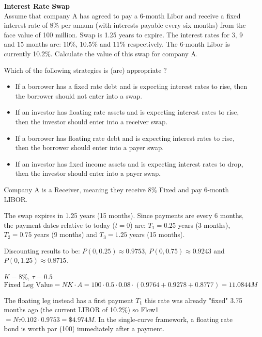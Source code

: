 \documentclass[12pt,a4paper]{exam}
\begin{document}
\begin{questions}
\question \textbf{Interest Rate Swap} \\
Assume that company A has agreed to pay a 6-month Libor and receive a fixed interest rate of 8\% per annum (with interests payable every six months) from the face value of 100 million. Swap is 1.25 years to expire. The interest rates for 3, 9 and 15 months are: 10\%, 10.5\% and 11\% respectively. The 6-month Libor is currently 10.2\%. Calculate the value of this swap for company A.

Which of the following strategies is (are) appropriate ?
\begin{itemize}
	\item If a borrower has a fixed rate debt and is expecting interest rates to rise, then the borrower should not enter into a swap.
	\item If an investor has floating rate assets and is expecting interest rates to rise, then the investor should enter into a receiver swap.
	\item If a borrower has floating rate debt and is expecting interest rates to rise, then the borrower should enter into a payer swap.
	\item If an investor has fixed income assets and is expecting interest rates to drop, then the investor should enter into a payer swap.
\end{itemize}

\begin{solution}
Company A is a Receiver, meaning they receive 8\% Fixed and pay 6-month LIBOR.

The swap expires in 1.25 years (15 months). Since payments are every 6 months, the payment dates relative to today ($t=0$) are: $T_1=0.25$ years (3 months), $T_2=0.75$ years (9 months) and $T_3=1.25$ years (15 months).

Discounting results to be: $P(0,0.25)\approx 0.9753$, $P(0,0.75)\approx 0.9243$ and $P(0,1.25)\approx 0.8715$.

$K=8\%$, $\tau=0.5$
\begin{equation*}
\text{Fixed Leg Value} = NK\cdot A = 100\cdot 0.5\cdot 0.08\cdot (0.9764+0.9278+0.8777) = 11.0844 M
\end{equation*}

The floating leg instead has a first payment $T_1$ this rate was already "fixed" 3.75 months ago (the current LIBOR of 10.2\%) so Flow1$= N\tau 0.102\cdot 0.9753 = \$4.974 M$.
In the single-curve framework, a floating rate bond is worth par (100) immediately after a payment.


\end{solution}
\end{questions}
\end{document}
